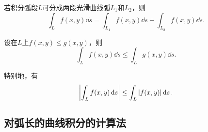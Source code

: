 \begin{property}\label{theorem:线积分与面积分.第一类曲线积分性质2}
若积分弧段\(L\)可分成两段光滑曲线弧\(L_1\)和\(L_2\)，则\[
\int_L f(x,y) \dd{s}
=\int_{L_1} f(x,y) \dd{s}
+\int_{L_2} f(x,y) \dd{s}.
\]
\end{property}

\begin{property}\label{theorem:线积分与面积分.第一类曲线积分性质3}
设在\(L\)上\(f(x,y) \leq g(x,y)\)，则\[
\int_L f(x,y) \dd{s}
\leq
\int_L g(x,y) \dd{s}.
\]

特别地，有\[
\abs{\int_L f(x,y) \dd{s}} \leq \int_L \abs{f(x,y)} \dd{s}.
\]
\end{property}

\subsection{对弧长的曲线积分的计算法}
